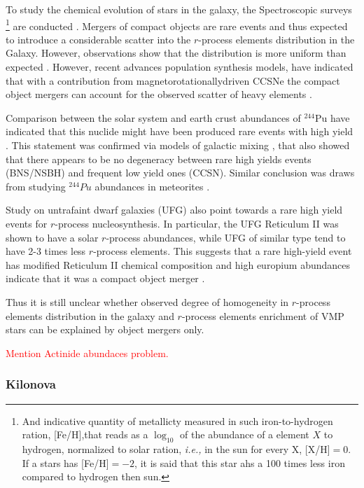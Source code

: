 \documentclass[11pt,a4paper,headinclude=true,DIV=14,BCOR=8mm,chapterprefix,listof=totoc,twoside,openright,abstracton]{scrbook}
\newcommand{\red}[1]{\textcolor{red}{#1}}
\begin{document}
To study the chemical evolution of stars in the galaxy, the Spectroscopic surveys \footnote{And indicative quantity of metallicty measured in such iron-to-hydrogen ration, [Fe/H],that reads as a $\log_{10}$ of the abundance of a element $X$ to hydrogen, normalized to solar ration, \textit{i.e.,} in the sun for every X, [X/H]$= 0$. If a stars has [Fe/H]$=-2$, it is said that this star ahs a 100 times less iron compared to hydrogen then sun.} are conducted \cite{Edvardsson:1993,Suda:2008na}. 
Mergers of compact objects are rare events and thus expected to introduce a considerable scatter into the $r$-process elements distribution in the Galaxy. However, observations show that the distribution is more uniform than expected \cite{Argast:2003he}.
However, recent advances population synthesis models, have indicated that with a contribution from magnetorotationallydriven CCSNe the compact object mergers can account for the observed scatter of heavy elements \cite{Ishimaru:2015,Cescutti:2015,Wehmeyer:2015,VanDeVoort:2015}.

Comparison between the solar system and earth crust abundances of $^{244}$Pu have indicated that this nuclide might have been produced rare events with high yield \cite{Wallner:2015}. This statement was confirmed via models of galactic mixing \cite{Hotokezaka:2015zea}, that also showed that there appears to be no degeneracy between rare high yields events (BNS/NSBH) and frequent low yield ones (CCSN). Similar conclusion was draws from studying $^{244}Pu$ abundances in meteorites \cite{Tsujimoto:2017}.

Study on untrafaint dwarf galaxies (UFG) also point towards a rare high yield events for $r$-process nucleosynthesis. In particular, the UFG Reticulum II was shown to have a solar $r$-process abundances, while UFG of similar type tend to have 2-3 times less $r$-process elements. This suggests that a rare high-yield event has modified Reticulum II chemical composition and high europium abundances indicate that it was a compact object merger \cite{Ji:2016}. 

Thus it is still unclear whether observed degree of homogeneity in $r$-process elements distribution in the galaxy and $r$-process elements enrichment of VMP stars can be explained by object mergers only. 

\red{Mention Actinide abundaces problem.}


\subsubsection{Kilonova}
\end{document}
